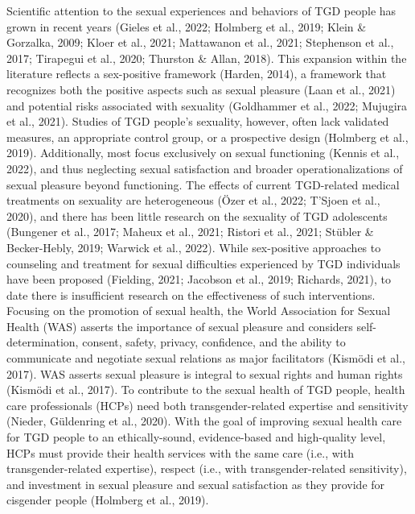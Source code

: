 \documentclass[
]{book}
\begin{document}
Scientific attention to the sexual experiences
and behaviors of TGD people has grown in recent
years (Gieles et al., 2022; Holmberg et al., 2019;
Klein \& Gorzalka, 2009; Kloer et al., 2021;
Mattawanon et al., 2021; Stephenson et al., 2017;
Tirapegui et al., 2020; Thurston \& Allan, 2018).
This expansion within the literature reflects a
sex-positive framework (Harden, 2014), a framework that recognizes both the positive aspects
such as sexual pleasure (Laan et al., 2021) and
potential risks associated with sexuality
(Goldhammer et al., 2022; Mujugira et al., 2021).
Studies of TGD people's sexuality, however, often
lack validated measures, an appropriate control
group, or a prospective design (Holmberg et al.,
2019). Additionally, most focus exclusively on
sexual functioning (Kennis et al., 2022), and thus
neglecting sexual satisfaction and broader operationalizations of sexual pleasure beyond functioning. The effects of current TGD-related
medical treatments on sexuality are heterogeneous
(Özer et al., 2022; T'Sjoen et al., 2020), and there
has been little research on the sexuality of TGD
adolescents (Bungener et al., 2017; Maheux et al.,
2021; Ristori et al., 2021; Stübler \& Becker-Hebly,
2019; Warwick et al., 2022). While sex-positive
approaches to counseling and treatment for sexual
difficulties experienced by TGD individuals have
been proposed (Fielding, 2021; Jacobson et al.,
2019; Richards, 2021), to date there is insufficient
research on the effectiveness of such interventions. Focusing on the promotion of sexual
health, the World Association for Sexual Health
(WAS) asserts the importance of sexual pleasure
and considers self-determination, consent, safety,
privacy, confidence, and the ability to communicate and negotiate sexual relations as major facilitators (Kismödi et al., 2017). WAS asserts sexual
pleasure is integral to sexual rights and human
rights (Kismödi et al., 2017). To contribute to
the sexual health of TGD people, health care
professionals (HCPs) need both transgender-related
expertise and sensitivity (Nieder, Güldenring
et al., 2020). With the goal of improving sexual
health care for TGD people to an ethically-sound,
evidence-based and high-quality level, HCPs must
provide their health services with the same care
(i.e., with transgender-related expertise), respect
(i.e., with transgender-related sensitivity), and
investment in sexual pleasure and sexual satisfaction as they provide for cisgender people
(Holmberg et al., 2019).
\end{document}

